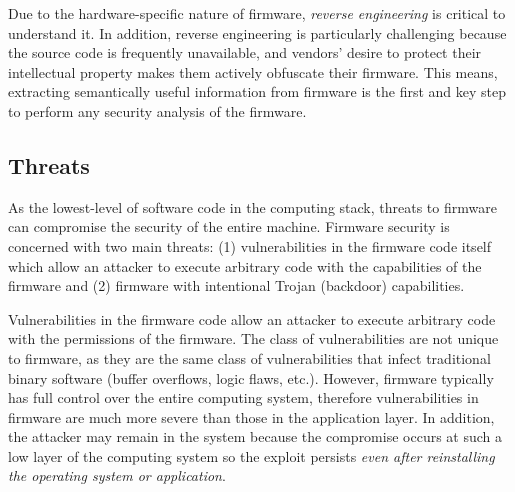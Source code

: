 \documentclass[11pt,letterpaper]{article}
\begin{document}

Due to the hardware-specific nature of firmware, \emph{reverse
  engineering} is critical to understand it. In addition,
reverse engineering is particularly challenging because the source code is
frequently unavailable, and vendors' desire to protect their
intellectual property makes them actively obfuscate their
firmware. This means, extracting semantically useful
information from firmware is the first and key step to perform any
security analysis of the firmware.

\subsection{Threats}

As the lowest-level of software code in the computing stack, threats
to firmware can compromise the security of the entire machine.
Firmware security is concerned with two main threats: (1)
vulnerabilities in the firmware code itself which allow an attacker to
execute arbitrary code with the capabilities of the firmware and (2)
firmware with intentional Trojan (backdoor) capabilities.


Vulnerabilities in the firmware code allow an attacker to execute
arbitrary code with the permissions of the firmware. The class of
vulnerabilities are not unique to firmware, as they are the same class
of vulnerabilities that infect traditional binary software (buffer
overflows, logic flaws, etc.). However, firmware typically has full
control over the entire computing system, therefore vulnerabilities in
firmware are much more severe than those in the application layer. In
addition, the attacker may remain in the system because the
compromise occurs at such a low layer of the computing system so the
exploit persists \emph{even after reinstalling the operating
system or application}.
\end{document}
